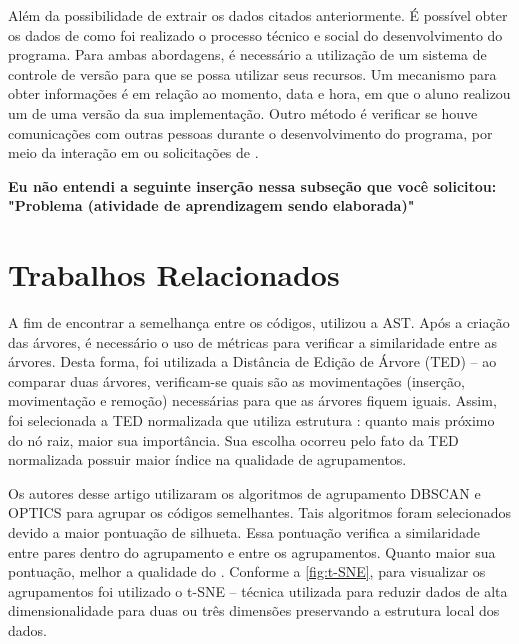 			Além da possibilidade de extrair os dados citados anteriormente. É possível
			obter os dados de como foi realizado o processo técnico e social do desenvolvimento
			do programa. Para ambas abordagens, é necessário a utilização de um sistema de
			controle de versão para que se possa utilizar seus recursos. Um mecanismo para
			obter informações é em relação ao momento, data e hora, em que o aluno realizou
			um  de uma versão da sua implementação. Outro método é verificar
			se houve comunicações com outras pessoas durante o desenvolvimento do programa,
			por meio da interação em  ou solicitações de .
			
			\textbf{Eu não entendi a seguinte inserção nessa subseção que você solicitou:
				"Problema (atividade de aprendizagem sendo elaborada)"}

	\section{Trabalhos Relacionados}
	\label{sec:TrabRel}
	
	    A fim de encontrar a semelhança entre os códigos, 
	    utilizou a AST. Após a criação das árvores, é necessário o uso de métricas
	    para verificar a similaridade entre as árvores. Desta forma, foi utilizada
	    a Distância de Edição de Árvore (TED) – ao comparar duas árvores, verificam-se
	    quais são as movimentações (inserção, movimentação e remoção) necessárias
	    para que as árvores fiquem iguais. Assim, foi selecionada a TED normalizada
	    que utiliza estrutura : quanto mais próximo do nó raiz,
	    maior sua importância. Sua escolha ocorreu pelo fato da TED normalizada
	    possuir maior índice na qualidade de agrupamentos.
	    
	    Os autores desse artigo utilizaram os algoritmos de agrupamento
	    DBSCAN \cite{Ester1996} e OPTICS \cite{Ankerst1999} para agrupar os códigos
	    semelhantes. Tais algoritmos foram selecionados devido a maior pontuação
	    de silhueta. Essa pontuação verifica a similaridade entre pares dentro do
	    agrupamento e entre os agrupamentos. Quanto maior sua pontuação, melhor a
	    qualidade do . Conforme a \cref{fig:t-SNE}, para
	    visualizar os agrupamentos foi utilizado o t-SNE \cite{maaten2008} – técnica
	    utilizada para reduzir dados de alta dimensionalidade para duas ou três
	    dimensões preservando a estrutura local dos dados.
	    
